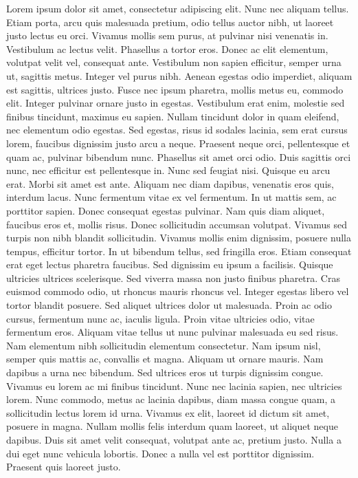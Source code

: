 \documentclass[12pt]{article}
\begin{document}
Lorem ipsum dolor sit amet, consectetur adipiscing elit. Nunc nec aliquam tellus. Etiam porta, arcu quis malesuada pretium, odio tellus auctor nibh, ut laoreet justo lectus eu orci. Vivamus mollis sem purus, at pulvinar nisi venenatis in. Vestibulum ac lectus velit. Phasellus a tortor eros. Donec ac elit elementum, volutpat velit vel, consequat ante. Vestibulum non sapien efficitur, semper urna ut, sagittis metus. Integer vel purus nibh. Aenean egestas odio imperdiet, aliquam est sagittis, ultrices justo. Fusce nec ipsum pharetra, mollis metus eu, commodo elit. Integer pulvinar ornare justo in egestas. Vestibulum erat enim, molestie sed finibus tincidunt, maximus eu sapien. Nullam tincidunt dolor in quam eleifend, nec elementum odio egestas.
Sed egestas, risus id sodales lacinia, sem erat cursus lorem, faucibus dignissim justo arcu a neque. Praesent neque orci, pellentesque et quam ac, pulvinar bibendum nunc. Phasellus sit amet orci odio. Duis sagittis orci nunc, nec efficitur est pellentesque in. Nunc sed feugiat nisi. Quisque eu arcu erat. Morbi sit amet est ante.
Aliquam nec diam dapibus, venenatis eros quis, interdum lacus. Nunc fermentum vitae ex vel fermentum. In ut mattis sem, ac porttitor sapien. Donec consequat egestas pulvinar. Nam quis diam aliquet, faucibus eros et, mollis risus. Donec sollicitudin accumsan volutpat. Vivamus sed turpis non nibh blandit sollicitudin. Vivamus mollis enim dignissim, posuere nulla tempus, efficitur tortor. In ut bibendum tellus, sed fringilla eros. Etiam consequat erat eget lectus pharetra faucibus. Sed dignissim eu ipsum a facilisis.
Quisque ultricies ultrices scelerisque. Sed viverra massa non justo finibus pharetra. Cras euismod commodo odio, ut rhoncus mauris rhoncus vel. Integer egestas libero vel tortor blandit posuere. Sed aliquet ultrices dolor ut malesuada. Proin ac odio cursus, fermentum nunc ac, iaculis ligula. Proin vitae ultricies odio, vitae fermentum eros. Aliquam vitae tellus ut nunc pulvinar malesuada eu sed risus. Nam elementum nibh sollicitudin elementum consectetur.
Nam ipsum nisl, semper quis mattis ac, convallis et magna. Aliquam ut ornare mauris. Nam dapibus a urna nec bibendum. Sed ultrices eros ut turpis dignissim congue. Vivamus eu lorem ac mi finibus tincidunt. Nunc nec lacinia sapien, nec ultricies lorem. Nunc commodo, metus ac lacinia dapibus, diam massa congue quam, a sollicitudin lectus lorem id urna. Vivamus ex elit, laoreet id dictum sit amet, posuere in magna. Nullam mollis felis interdum quam laoreet, ut aliquet neque dapibus. Duis sit amet velit consequat, volutpat ante ac, pretium justo. Nulla a dui eget nunc vehicula lobortis. Donec a nulla vel est porttitor dignissim. Praesent quis laoreet justo.
\end{document}
